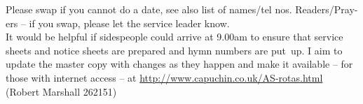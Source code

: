 \documentclass[10pt]{article}
\newcommand*{\vcenteredhbox}[1]{\begingroup
\setbox0=\hbox{#1}\parbox{\wd0}{\box0}\endgroup}
\begin{document}
\begin{center}

\end{center}
\hspace{1.15em}
\begin{minipage}{0.15\textwidth}
\ifpdf
\else
\hspace{0.5em}
\fi
\end{minipage}
\begin{minipage}{0.90\textwidth}
{%
\footnotesize Please swap if you cannot do a date, see also list of names/tel nos.
Readers/Pray-ers -- if you swap, please let the service leader know.\\
 It would be helpful if sidespeople 
could arrive at 9.00am to ensure that service sheets and notice sheets are 
prepared and hymn numbers are put~up.
I aim to update the master copy with changes as they
happen and make it available -- for those with internet access
-- at 
 \url{http://www.capuchin.co.uk/AS-rotas.html} 
(Robert Marshall 262151)}
\end{minipage}
\end{document}

